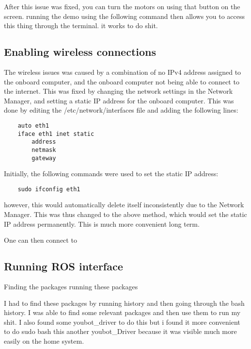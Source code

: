 \documentclass[a4paper, 12pt]{article}
\newif\ifshownotes
\newcommand{\notes}[1]{\ifshownotes\textcolor{blue}{#1}\fi}
\begin{document}
    
    After this issue was fixed, you can turn the motors on using that button on the screen. running the demo using the following command then allows you to access this thing through the terminal. it works to do shit.


    \subsection{Enabling wireless connections}

    The wireless issues was caused by a combination of no IPv4 address assigned to the onboard computer, and the onboard computer not being able to connect to the internet. This was fixed by changing the network settings in the Network Manager, and setting a static IP address for the onboard computer. This was done by editing the /etc/network/interfaces file and adding the following lines:

    \begin{verbatim}
    auto eth1
    iface eth1 inet static
        address
        netmask
        gateway
    \end{verbatim}

    Initially, the following commands were used to set the static IP address: 
    \begin{verbatim}
    sudo ifconfig eth1
    \end{verbatim}
    however, this would automatically delete itself inconsistently due to the Network Manager. This was thus changed to the above method, which would set the static IP address permanently. This is much more convenient long term. 

    One can then connect to 


    \pagebreak


    \subsection{Running ROS interface}

    \notes{
        so what packages were there?
    }

    \notes{describe the process of inspecting the installed software, the drivers and wrappers, and running the original demos.}
     \notes{rqt, rviz, the various topics and nodes, etc. }
    Finding the packages
    running these packages

    I had to find these packages by running history and then going through the bash history. I was able to find some relevant packages and then use them to run my shit. I also found some youbot\_driver to do this but i found it more convenient to do sudo bash this another youbot\_Driver because it was visible much more easily on the home system. 
\end{document}

